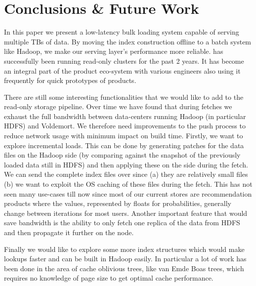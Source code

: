 \section{Conclusions \& Future Work}
\label{sec:conclusion}

In this paper we present a low-latency bulk loading system capable of serving multiple TBs of data. By moving the index construction offline to a batch system like Hadoop, we make our serving layer's performance more reliable. \linkedin{} has successfully been running read-only \projectname{} clusters for the past 2 years. It has become an integral part of the product eco-system with various engineers also using it frequently for quick prototypes of products. 

There are still some interesting functionalities that we would like to add to the read-only storage pipeline. Over time we have found that during fetches we exhaust the full bandwidth between data-centers running Hadoop (in particular HDFS) and Voldemort. We therefore need improvements to the push process to reduce network usage with minimum impact on build time. Firstly, we want to explore incremental loads. This can be done by generating patches for the data files on the Hadoop side (by comparing against the snapshot of the previously loaded data still in HDFS) and then applying these on the \projectname{} side during the fetch. We can send the complete index files over since (a) they are relatively small files (b) we want to exploit the OS caching of these files during the fetch. This has not seen many use-cases till now since most of our current stores are recommendation products where the values, represented by floats for probabilities, generally change between iterations for most users. Another important feature that would save bandwidth is the ability to only fetch one replica of the data from HDFS and then propagate it further on the \projectname{} node. 

Finally we would like to explore some more index structures which would make lookups faster and can be built in Hadoop easily. In particular a lot of work has been done in the area of cache oblivious trees, like van Emde Boas trees, which requires no knowledge of page size to get optimal cache performance. 
